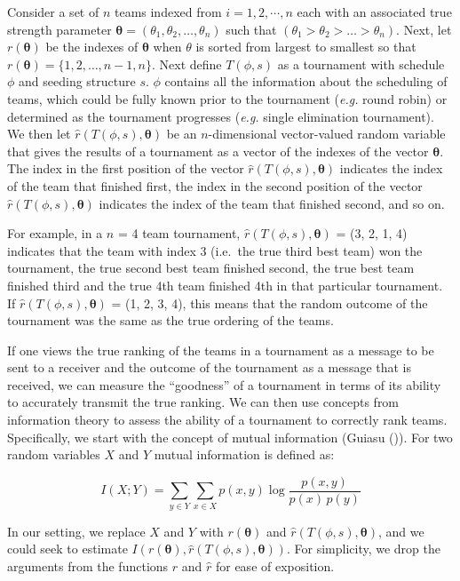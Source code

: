 \documentclass[
  12pt,
]{article}
\begin{document}
Consider a set of \(n\) teams indexed from \(i = 1, 2, \cdots, n\) each
with an associated true strength parameter
\(\boldsymbol{\theta} = (\theta_1, \theta_2, \ldots, \theta_n)\) such
that \((\theta_1 > \theta_2 > \ldots > \theta_n)\). Next, let
\(r(\boldsymbol{\theta})\) be the indexes of \(\boldsymbol{\theta}\)
when \(\theta\) is sorted from largest to smallest so that
\(r(\boldsymbol{\theta}) = \{1, 2, \ldots, n-1, n\}\). Next define
\(T(\phi, s)\) as a tournament with schedule \(\phi\) and seeding
structure \(s\). \(\phi\) contains all the information about the
scheduling of teams, which could be fully known prior to the tournament
(\emph{e.g.} round robin) or determined as the tournament progresses
(\emph{e.g.} single elimination tournament). We then let
\(\hat{r}(T(\phi, s),\boldsymbol{\theta})\) be an \(n\)-dimensional
vector-valued random variable that gives the results of a tournament as
a vector of the indexes of the vector \(\boldsymbol{\theta}\). The index
in the first position of the vector
\(\hat{r}(T(\phi, s),\boldsymbol{\theta})\) indicates the index of the
team that finished first, the index in the second position of the vector
\(\hat{r}(T(\phi, s),\boldsymbol{\theta})\) indicates the index of the
team that finished second, and so on.

For example, in a \(n\) = 4 team tournament,
\(\hat{r}(T(\phi, s),\boldsymbol{\theta})\) = (3, 2, 1, 4) indicates
that the team with index 3 (i.e.~the true third best team) won the
tournament, the true second best team finished second, the true best
team finished third and the true 4th team finished 4th in that
particular tournament. If \(\hat{r}(T(\phi, s),\boldsymbol{\theta})\) =
(1, 2, 3, 4), this means that the random outcome of the tournament was
the same as the true ordering of the teams.

If one views the true ranking of the teams in a tournament as a message
to be sent to a receiver and the outcome of the tournament as a message
that is received, we can measure the ``goodness'' of a tournament in
terms of its ability to accurately transmit the true ranking. We can
then use concepts from information theory to assess the ability of a
tournament to correctly rank teams. Specifically, we start with the
concept of mutual information (Guiasu
()). For two random variables \(X\)
and \(Y\) mutual information is defined as:

\[
I(X;Y)=\sum_{y\in Y}\sum_{x\in X}p(x,y)\log \frac {p(x,y)}{p(x)\,p(y)}
\]

In our setting, we replace \(X\) and \(Y\) with
\(r(\boldsymbol{\theta})\) and
\(\hat{r}(T(\phi, s),\boldsymbol{\theta})\), and we could seek to
estimate
\(I(r(\boldsymbol{\theta}),\hat{r}(T(\phi, s),\boldsymbol{\theta}))\).
For simplicity, we drop the arguments from the functions \(r\) and
\(\hat{r}\) for ease of exposition.
\end{document}
